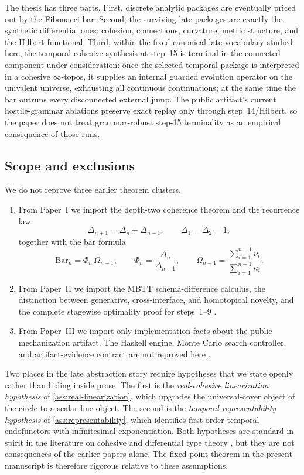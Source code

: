 \documentclass[11pt]{article}
\theoremstyle{plain}
\theoremstyle{definition}
\theoremstyle{remark}
\newcommand{\SelBar}{\mathrm{Bar}}
\begin{document}
The thesis has three parts. First, discrete analytic packages are eventually priced out by the Fibonacci bar. Second, the surviving late packages are exactly the synthetic differential ones: cohesion, connections, curvature, metric structure, and the Hilbert functional. Third, within the fixed canonical late vocabulary studied here, the temporal-cohesive synthesis at step~15 is terminal in the connected component under consideration: once the selected temporal package is interpreted in a cohesive $\infty$-topos, it supplies an internal guarded evolution operator on the univalent universe, exhausting all continuous continuations; at the same time the bar outruns every disconnected external jump. The public artifact's current hostile-grammar ablations preserve exact replay only through step~14/Hilbert, so the paper does not treat grammar-robust step-15 terminality as an empirical consequence of those runs.

\subsection{Scope and exclusions}

We do not reprove three earlier theorem clusters.

\begin{enumerate}
    \item From Paper~I we import the depth-two coherence theorem and the recurrence law
    \[
      \Delta_{n+1}=\Delta_n+\Delta_{n-1},
      \qquad
      \Delta_1=\Delta_2=1,
    \]
    together with the bar formula
    \[
      \SelBar_n = \Phi_n\,\Omega_{n-1},
      \qquad
      \Phi_n=\frac{\Delta_n}{\Delta_{n-1}},
      \qquad
      \Omega_{n-1}=\frac{\sum_{i=1}^{n-1}\nu_i}{\sum_{i=1}^{n-1}\kappa_i}.
    \]
    \item From Paper~II we import the MBTT schema-difference calculus, the distinction between generative, cross-interface, and homotopical novelty, and the complete stagewise optimality proof for steps~1--9 \citep{lande-generative}.
    \item From Paper~III we import only implementation facts about the public mechanization artifact. The Haskell engine, Monte Carlo search controller, and artifact-evidence contract are not reproved here \citep{lande-automation,lande-repo}.
\end{enumerate}

Two places in the late abstraction story require hypotheses that we state openly rather than hiding inside prose. The first is the \emph{real-cohesive linearization hypothesis} of \cref{ass:real-linearization}, which upgrades the universal-cover object of the circle to a scalar line object. The second is the \emph{temporal representability hypothesis} of \cref{ass:representability}, which identifies first-order temporal endofunctors with infinitesimal exponentiation. Both hypotheses are standard in spirit in the literature on cohesive and differential type theory \citep{lawvere,kock,schreiber,shulman-real-cohesive}, but they are not consequences of the earlier papers alone. The fixed-point theorem in the present manuscript is therefore rigorous relative to these assumptions.
\end{document}
